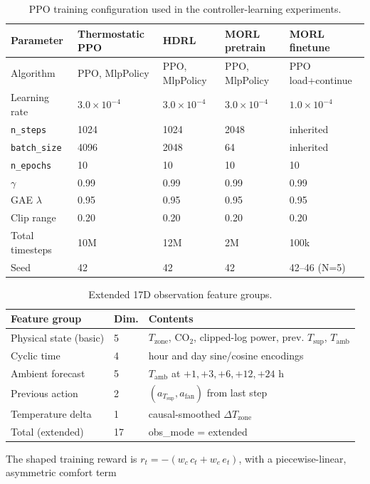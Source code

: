 \documentclass[11pt,a4paper]{article}
\begin{document}
\begin{table}[H]
\centering
\caption{PPO training configuration used in the controller-learning experiments.}
\label{tab:ppo_hparams}
\small
\begin{tabular}{lllll}
\toprule
Parameter & Thermostatic PPO & HDRL & MORL pretrain & MORL finetune \\
\midrule
Algorithm & PPO, MlpPolicy & PPO, MlpPolicy & PPO, MlpPolicy & PPO load+continue \\
Learning rate & $3.0{\times}10^{-4}$ & $3.0{\times}10^{-4}$ & $3.0{\times}10^{-4}$ & $1.0{\times}10^{-4}$ \\
\texttt{n\_steps} & 1024 & 1024 & 2048 & inherited \\
\texttt{batch\_size} & 4096 & 2048 & 64 & inherited \\
\texttt{n\_epochs} & 10 & 10 & 10 & 10 \\
$\gamma$ & 0.99 & 0.99 & 0.99 & 0.99 \\
GAE $\lambda$ & 0.95 & 0.95 & 0.95 & 0.95 \\
Clip range & 0.20 & 0.20 & 0.20 & 0.20 \\
Total timesteps & 10M & 12M & 2M & 100k \\
Seed & 42 & 42 & 42 & 42--46 (N=5) \\
\bottomrule
\end{tabular}
\end{table}
\begin{table}[H]
\centering
\caption{Extended 17D observation feature groups.}
\label{tab:obs17}
\small
\begin{tabularx}{\linewidth}{llX}
\toprule
Feature group & Dim. & Contents \\
\midrule
Physical state (basic) & 5 & $T_{\mathrm{zone}}$, CO$_2$, clipped-log power, prev. $T_{\mathrm{sup}}$, $T_{\mathrm{amb}}$ \\
Cyclic time & 4 & hour and day sine/cosine encodings \\
Ambient forecast & 5 & $T_{\mathrm{amb}}$ at $+1,+3,+6,+12,+24$ h \\
Previous action & 2 & $(a_{T_{\mathrm{sup}}}, a_{\mathrm{fan}})$ from last step \\
Temperature delta & 1 & causal-smoothed $\Delta T_{\mathrm{zone}}$ \\
Total (extended) & 17 & obs\_mode = extended \\
\bottomrule
\end{tabularx}
\end{table}
The shaped training reward is $r_t=-(w_c\,c_t + w_e\,e_t)$, with a piecewise-linear, asymmetric comfort term
\end{document}
